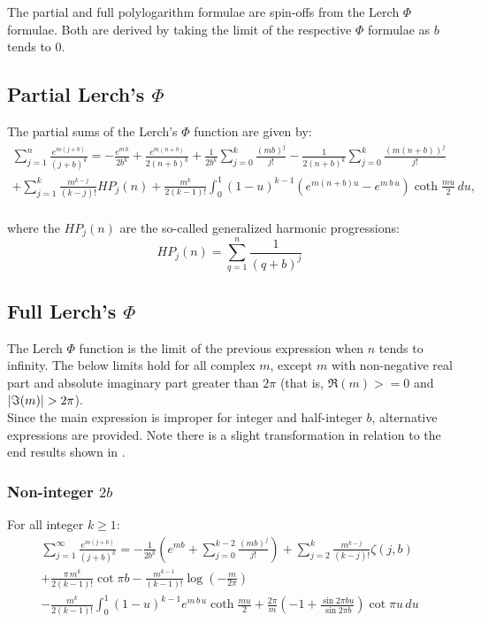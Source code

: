 \documentclass[12pt]{article}
\DeclarePairedDelimiter\abs{\lvert}{\rvert}%
\newcommand*{\citena}[1]{%
\begingroup
[\color{Green}
\romannumeral-`\x %
\setcitestyle{numbers}%
\cite{#1}%
\endgroup
]\ignorespacesafterend
}
\begin{document}
The partial and full polylogarithm formulae are spin-offs from the Lerch $\Phi$ formulae. Both are derived by taking the limit of the respective $\Phi$ formulae as $b$ tends to 0. 

\subsection{Partial Lerch's $\Phi$}
The partial sums of the Lerch's $\Phi$ function are given by:
\begin{multline} \label{eq:lerch_parc} 
\sum _{j=1}^{n}\frac{e^{m(j+b)}}{(j+b)^{k}}=-\frac{e^{m\,b}}{2b^{k}}+\frac{e^{m(n+b)}}{2(n+b)^{k}}+\frac{1}{2b^{k}}\sum_{j=0}^{k}\frac{(m b)^j}{j!}-\frac{1}{2(n+b)^{k}}\sum_{j=0}^{k}\frac{(m (n+b))^j}{j!}\\+\sum_{j=1}^{k}\frac{m^{k-j}}{(k-j)!}HP_{j}(n)+\frac{m^{k}}{2(k-1)!}\int_0^1(1-u)^{k-1}\left(e^{m(n+b) u}-e^{m\,b\,u}\right)\coth{\frac{m u}{2}}\,du \text{,}
\end{multline}\\
\noindent where the $HP_{j}(n)$ are the so-called generalized harmonic progressions:
\begin{equation} \nonumber
HP_{j}(n)=\sum_{q=1}^{n}\frac{1}{(q+b)^j} \text{}
\end{equation}

\subsection{Full Lerch's $\Phi$}
The Lerch $\Phi$ function is the limit of the previous expression when $n$ tends to infinity. The below limits hold for all complex $m$, except $m$ with non-negative real part and absolute imaginary part greater than $2\pi$ (that is, $\Re{(m)}>=0$ and $\abs{\Im{(m)}}>2\pi$).\\

Since the main expression is improper for integer and half-integer $b$, alternative expressions are provided. Note there is a slight transformation in relation to the end results shown in \citena{Lerch}.

\subsubsection{Non-integer $2b$}
For all integer $k \ge 1$:
\begin{multline} \label{eq:lerch_full} 
\sum _{j=1}^{\infty}\frac{e^{m(j+b)}}{(j+b)^{k}}=-\frac{1}{2b^{k}}\left(e^{m b}+\sum_{j=0}^{k-2}\frac{(m b)^j}{j!}\right)+\sum_{j=2}^{k}\frac{m^{k-j}}{(k-j)!}\zeta(j,b)\\+\frac{\pi\,m^k}{2(k-1)!}\cot{\pi b}-\frac{m^{k-1}}{(k-1)!}\log{\left(-\frac{m}{2\pi}\right)}\\-\frac{m^{k}}{2(k-1)!}\int_0^1(1-u)^{k-1}e^{m\,b\,u}\coth{\frac{m u}{2}}+\frac{2\pi}{m}\left(-1+\frac{\sin{2\pi b u}}{\sin{2\pi b}}\right)\cot{\pi u}\,du 
\end{multline}
\end{document}
